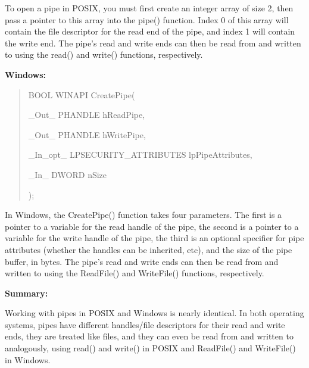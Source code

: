 \documentclass[letterpaper,10pt,titlepage]{article}
\newcommand{\tab}{\hspace*{2em}} %
\begin{document}
\begin{enumerate}
To open a pipe in POSIX, you must first create an integer array of size 2, then pass a pointer to this array into the pipe() function. Index 0 of this array will contain the file descriptor for the read end of the pipe, and index 1 will contain the write end. The pipe's read and write ends can then be read from and written to using the read() and write() functions, respectively.  \newline

\textbf{Windows:} 

\begin{quote}
BOOL WINAPI CreatePipe(

\tab\_Out\_     PHANDLE hReadPipe,

\tab\_Out\_     PHANDLE hWritePipe,

\tab\_In\_opt\_  LPSECURITY\_ATTRIBUTES lpPipeAttributes,

\tab\_In\_      DWORD nSize

);
\end{quote}


\tab In Windows, the CreatePipe() function takes four parameters. The first is a pointer to a variable for the read handle of the pipe, the second is a pointer to a variable for the write handle of the pipe, the third is an optional specifier for pipe attributes (whether the handles can be inherited, etc), and the size of the pipe buffer, in bytes. The pipe's read and write ends can then be read from and written to using the ReadFile() and WriteFile() functions, respectively.


\textbf{Summary:} \newline

\tab Working with pipes in POSIX and Windows is nearly identical. In both operating systems, pipes have different handles/file descriptors for their read and write ends, they are treated like files, and they can even be read from and written to analogously, using read() and write() in POSIX and ReadFile() and WriteFile() in Windows.



\end{enumerate}

%
\end{document}
